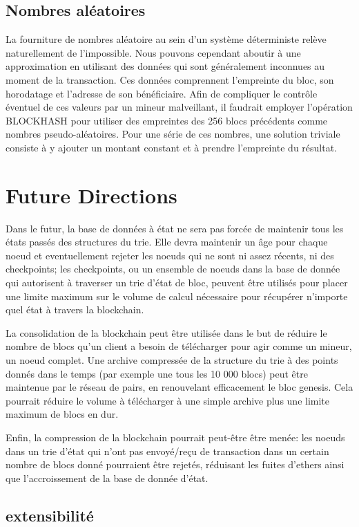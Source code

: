 \documentclass[9pt,oneside]{amsart}
\begin{document}
\begin{multicols}{2}
\subsection{Nombres aléatoires}
La fourniture de nombres aléatoire au sein d'un système déterministe relève naturellement de l'impossible. Nous pouvons cependant aboutir à une approximation en utilisant des données qui sont généralement inconnues au moment de la transaction. Ces données comprennent l'empreinte du bloc, son horodatage et l'adresse de son bénéficiaire. Afin de compliquer le contrôle éventuel de ces valeurs par un mineur malveillant, il faudrait employer l'opération {\small BLOCKHASH} pour utiliser des empreintes des 256 blocs précédents comme nombres pseudo-aléatoires. Pour une série de ces nombres, une solution triviale consiste à y ajouter un montant constant et à prendre l'empreinte du résultat.

\section{Future Directions} \label{ch:future}

Dans le futur, la base de données à état ne sera pas forcée de maintenir tous les états passés des structures du trie. Elle devra maintenir un âge pour chaque noeud et eventuellement rejeter les noeuds qui ne sont ni assez récents, ni des checkpoints; les checkpoints, ou un ensemble de noeuds dans la base de donnée qui autorisent à traverser un trie d'état de bloc, peuvent être utilisés pour placer une limite maximum sur le volume de calcul nécessaire pour récupérer n'importe quel état à travers la blockchain.

La consolidation de la blockchain peut être utilisée dans le but de réduire le nombre de blocs qu'un client a besoin de télécharger pour agir comme un mineur, un noeud complet. Une archive compressée de la structure du trie à des points donnés dans le temps (par exemple une tous les 10 000 blocs) peut être maintenue par le réseau de pairs, en renouvelant efficacement le bloc genesis. Cela pourrait réduire le volume à télécharger à une simple archive plus une limite maximum de blocs en dur.

Enfin, la compression de la blockchain pourrait peut-être être menée: les noeuds dans un trie d'état qui n'ont pas envoyé/reçu de transaction dans un certain nombre de blocs donné pourraient être rejetés, réduisant les fuites d'ethers ainsi que l'accroissement de la base de donnée d'état.

\subsection{extensibilité}


\end{multicols}
\end{document}
